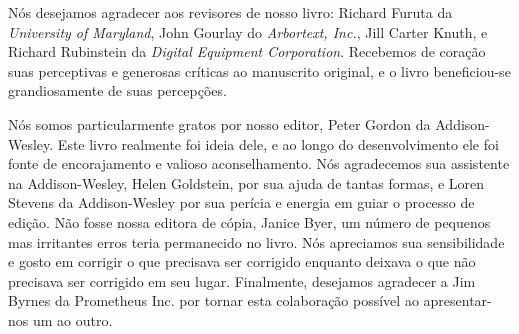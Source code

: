 Nós desejamos agradecer aos revisores de nosso livro: Richard Furuta da {\it
  University of Maryland}, John Gourlay do {\it Arbortext, Inc.}, Jill Carter
Knuth, e Richard Rubinstein da {\it Digital Equipment Corporation}. Recebemos de
coração suas perceptivas e generosas críticas ao manuscrito original, e o livro
beneficiou-se grandiosamente de suas percepções.

Nós somos particularmente gratos por nosso editor, Peter Gordon da
Addison-Wesley. Este livro realmente foi ideia dele, e ao longo do
desenvolvimento ele foi fonte de encorajamento e valioso aconselhamento. Nós
agradecemos sua assistente na Addison-Wesley, Helen Goldstein, por sua ajuda de
tantas formas, e Loren Stevens da Addison-Wesley por sua perícia e energia em
guiar o processo de edição. Não fosse nossa editora de cópia, Janice Byer, um
número de pequenos mas irritantes erros teria permanecido no livro. Nós
apreciamos sua sensibilidade e gosto em corrigir o que precisava ser corrigido
enquanto deixava o que não precisava ser corrigido em seu lugar. Finalmente,
desejamos agradecer a Jim Byrnes da Prometheus Inc. por tornar esta colaboração
possível ao apresentar-nos um ao outro.

\baselineskip


